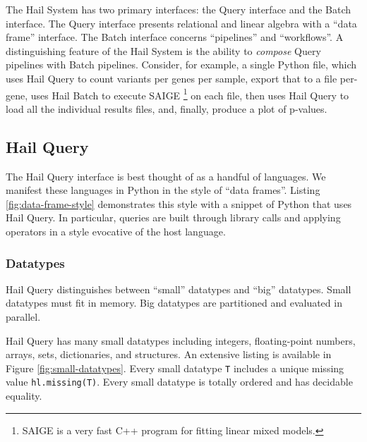 \documentclass[10pt,a4paper%
]{article}
\begin{document}
The Hail System has two primary interfaces: the Query interface and the Batch interface.
The Query interface presents relational and linear algebra with a ``data frame'' interface.
The Batch interface concerns ``pipelines'' and ``workflows''.
A distinguishing feature of the Hail System is the ability to \emph{compose} Query pipelines with Batch pipelines.
Consider, for example, a single Python file, which uses Hail Query to count variants per genes per sample, export that to a file per-gene, uses Hail Batch to execute SAIGE
\footnote{SAIGE is a very fast C++ program for fitting linear mixed models.}
on each file, then uses Hail Query to load all the individual results files, and, finally, produce a plot of p-values.

\subsection{Hail Query}

The Hail Query interface is best thought of as a handful of languages.
We manifest these languages in Python in the style of ``data frames''.
Listing \ref{fig:data-frame-style} demonstrates this style with a snippet of Python that uses Hail Query.
In particular, queries are built through library calls and applying operators in a style evocative of the host language.

\subsubsection{Datatypes}

Hail Query distinguishes between ``small'' datatypes and  ``big'' datatypes.
Small datatypes must fit in memory.
Big datatypes are partitioned and evaluated in parallel.

Hail Query has many small datatypes including integers, floating-point numbers, arrays, sets, dictionaries, and structures.
An extensive listing is available in Figure \ref{fig:small-datatypes}.
Every small datatype \texttt{T} includes a unique missing value \texttt{hl.missing(T)}.
Every small datatype is totally ordered and has decidable equality.
\end{document}
